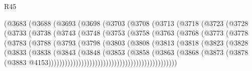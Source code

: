 \begin{lexlean}{R45}
\begin{coremodule}
{                (@3683
                  (@3688
                    (@3693
                      (@3698
                        (@3703
                          (@3708
                            (@3713
                              (@3718
                                (@3723
                                  (@3728
                                    (@3733
                                      (@3738
                                        (@3743
                                          (@3748
                                            (@3753
                                              (@3758
                                                (@3763
                                                  (@3768
                                                    (@3773
                                                      (@3778
                                                        (@3783
                                                          (@3788
                                                            (@3793
                                                              (@3798
                                                                (@3803
                                                                  (@3808
                                                                    (@3813
                                                                      (@3818
                                                                        (@3823
                                                                          (@3828
                                                                            (@3833
                                                                              (@3838
                                                                                (@3843
                                                                                  (@3848
                                                                                    (@3853
                                                                                      (@3858
                                                                                        (@3863
                                                                                          (@3868
                                                                                            (@3873
                                                                                              (@3878
                                                                                                (@3883
                                                                                                  @4153)))))))))))))))))))))))))))))))))))))))))))))))
}
\end{coremodule}
\end{lexlean}
